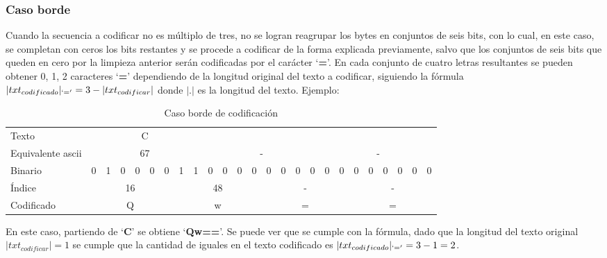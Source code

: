 \documentclass[titlepage,a4paper]{article}
\begin{document}
\subsubsection{Caso borde}
Cuando la secuencia a codificar no es múltiplo de tres, no se logran reagrupar los bytes en conjuntos de seis bits, con lo cual, en este caso, se completan con ceros los bits restantes y se procede a codificar de la forma explicada previamente, salvo que los conjuntos de seis bits que queden en cero por la limpieza anterior serán codificadas por el carácter `\textbf{=}'. En cada conjunto de cuatro letras resultantes se pueden obtener {0, 1, 2} caracteres `\textbf{=}' dependiendo de la longitud original del texto a codificar, siguiendo la fórmula $|txt_{codificado}|_{`='} = 3 - |txt_{codificar}|$ donde $|.|$ es la longitud del texto. Ejemplo:

\begin{table}[H]
\centering
\setlength{\tabcolsep}{4pt}
\begin{tabular}{l|cccccc||cc|cccc||cccc|cc||cccccc}
Texto             & \multicolumn{8}{c|}{C}        & \multicolumn{8}{c|}{}        & \multicolumn{8}{c}{}        \\
Equivalente ascii & \multicolumn{8}{c|}{67}       & \multicolumn{8}{c|}{-}      & \multicolumn{8}{c}{-}      \\
 Binario           & 0 & 1 & 0 & 0 & 0 & 0 & 1 & 1 & \cellcolor[HTML]{EAECF0}0 & \cellcolor[HTML]{EAECF0}0 & \cellcolor[HTML]{EAECF0}0 & \cellcolor[HTML]{EAECF0}0 & \cellcolor[HTML]{EAECF0}0 & \cellcolor[HTML]{EAECF0}0 & \cellcolor[HTML]{EAECF0}0 & \cellcolor[HTML]{EAECF0}0 & \cellcolor[HTML]{EAECF0}0 & \cellcolor[HTML]{EAECF0}0 & \cellcolor[HTML]{EAECF0}0 & \cellcolor[HTML]{EAECF0}0 & \cellcolor[HTML]{EAECF0}0 & \cellcolor[HTML]{EAECF0}0 & \cellcolor[HTML]{EAECF0}0 & \cellcolor[HTML]{EAECF0}0 \\
Índice & \multicolumn{6}{c||}{16} & \multicolumn{6}{c||}{48} & \multicolumn{6}{c||}{-} & \multicolumn{6}{c}{-} \\
Codificado & \multicolumn{6}{c||}{Q} & \multicolumn{6}{c||}{w} & \multicolumn{6}{c||}{=} & \multicolumn{6}{c}{=}
\end{tabular}
\caption{Caso borde de codificación}
\label{table:caso_borde}
\centering
\end{table}

En este caso, partiendo de `\textbf{C}' se obtiene `\textbf{Qw==}'. Se puede ver que se cumple con la fórmula, dado que la longitud del texto original $|txt_{codificar}| = 1$ se cumple que la cantidad de iguales en el texto codificado es $|txt_{codificado}|_{`='} = 3 - 1 = 2$.
\newline
\end{document}
